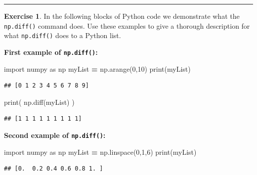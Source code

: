 \documentclass[
]{book}
\newenvironment{Shaded}{\begin{snugshade}}{\end{snugshade}}
\newcommand{\BuiltInTok}[1]{#1}
\newcommand{\DecValTok}[1]{\textcolor[rgb]{0.00,0.00,0.81}{#1}}
\newcommand{\ImportTok}[1]{#1}
\newcommand{\NormalTok}[1]{#1}
\newcommand{\OperatorTok}[1]{\textcolor[rgb]{0.81,0.36,0.00}{\textbf{#1}}}
\theoremstyle{definition}
\theoremstyle{definition}
\theoremstyle{definition}
\newtheorem{exercise}{Exercise}[chapter]
\theoremstyle{remark}
\begin{document}
\begin{center}\rule{0.5\linewidth}{0.5pt}\end{center}

\begin{exercise}
\protect\hypertarget{exr:unnamed-chunk-211}{}{\label{exr:unnamed-chunk-211} }In the following blocks of Python code we demonstrate what the \texttt{np.diff()} command does. Use these examples to give a thorough description for what \texttt{np.diff()} does to a Python list.
\end{exercise}

\textbf{First example of \texttt{np.diff()}:}

\begin{Shaded}
\begin{Highlighting}[]
\ImportTok{import}\NormalTok{ numpy }\ImportTok{as}\NormalTok{ np}
\NormalTok{myList }\OperatorTok{=}\NormalTok{ np.arange(}\DecValTok{0}\NormalTok{,}\DecValTok{10}\NormalTok{)}
\BuiltInTok{print}\NormalTok{(myList)}
\end{Highlighting}
\end{Shaded}

\begin{verbatim}
## [0 1 2 3 4 5 6 7 8 9]
\end{verbatim}

\begin{Shaded}
\begin{Highlighting}[]
\BuiltInTok{print}\NormalTok{( np.diff(myList) )}
\end{Highlighting}
\end{Shaded}

\begin{verbatim}
## [1 1 1 1 1 1 1 1 1]
\end{verbatim}

\textbf{Second example of \texttt{np.diff()}:}

\begin{Shaded}
\begin{Highlighting}[]
\ImportTok{import}\NormalTok{ numpy }\ImportTok{as}\NormalTok{ np}
\NormalTok{myList }\OperatorTok{=}\NormalTok{ np.linspace(}\DecValTok{0}\NormalTok{,}\DecValTok{1}\NormalTok{,}\DecValTok{6}\NormalTok{)}
\BuiltInTok{print}\NormalTok{(myList)}
\end{Highlighting}
\end{Shaded}

\begin{verbatim}
## [0.  0.2 0.4 0.6 0.8 1. ]
\end{verbatim}
\end{document}
